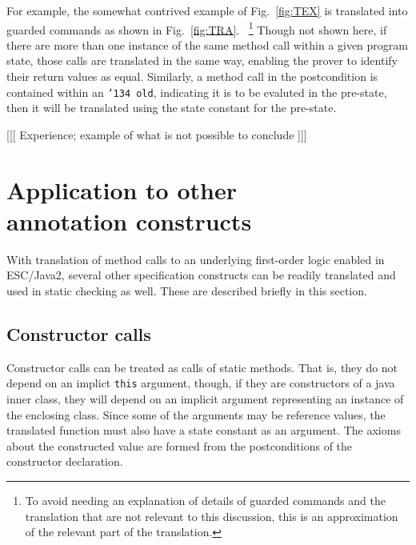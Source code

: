 \documentclass{sig-alternate}
\begin{document}
For example, the somewhat contrived example of Fig.~\ref{fig:TEX} is translated into guarded 
commands as shown in Fig.~\ref{fig:TRA}. ~\footnote{To avoid needing an explanation of
 details of guarded commands and the translation that are not relevant to this discussion, this
is an approximation of the relevant part of the translation.}  Though not shown here, if there are
more than one instance of the same method call within a given program state, those calls are
translated in the same way, enabling the prover to identify their return values as equal.  Similarly,
a method call in the postcondition is contained within an \texttt{\char'134 old}, indicating it is to
be evaluted in the pre-state, then it will be translated using the state constant for the pre-state.

\begin{BFIGURE}

\caption{A somewhat contrived example to illustrate the translations of method calls.}
\label{fig:TEX}
\end{BFIGURE}

\begin{BFIGURE}

\caption{A portion of the translation of method Example.checkMin.}
\label{fig:TRA}
\end{BFIGURE}

[[[ Experience; example of what is not possible to conclude ]]]

\section{Application to other \\ annotation constructs}

With translation of method calls to an underlying first-order logic enabled in ESC/Java2, 
several other specification constructs can be readily translated and used in static checking as 
well.  These are described briefly in this section.
 
\subsection{Constructor calls}

Constructor calls can be treated as calls of static methods.  That is, they do not depend on an
implict \texttt{this} argument, though, if they are constructors of a java inner class, they will depend 
on an implicit argument representing an instance of the enclosing class.  Since some of the 
arguments may be reference values, the translated function must also have a state constant
as an argument.  The axioms about the constructed value are formed from the postconditions
of the constructor declaration.
\end{document}
